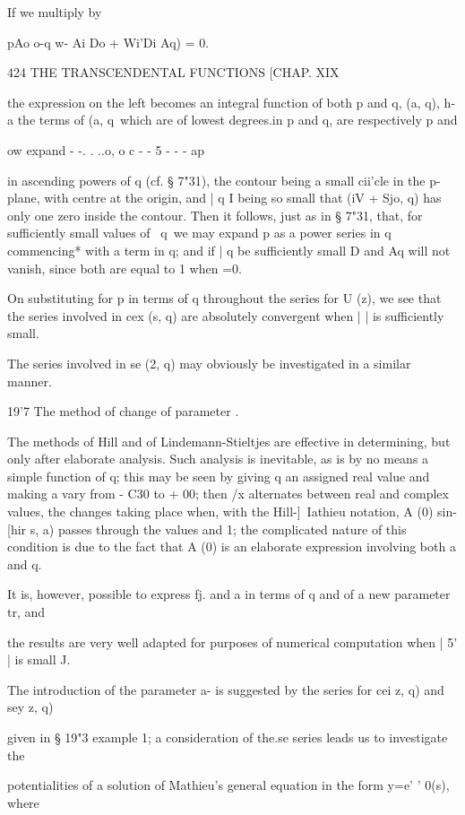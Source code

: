 {{If we multiply by

pAo o-q w- Ai Do + Wi'Di Aq) = 0.

424 THE TRANSCENDENTAL FUNCTIONS [CHAP. XIX

the expression on the left becomes an integral function of both p and
q, (a, q), h-a\; the terms of (a, q\ which are of lowest degrees.in p
and q, are respectively p and

 ow expand - -. . ..o, o c - - 5 - - - ap

in ascending powers of q (cf. § 7"31), the contour being a small
cii'cle in the p-plane, with centre at the origin, and | q I being so
small that (iV + Sjo, q) has only one zero inside the contour. Then it
follows, just as in § 7"31, that, for sufficiently small values of \
q\, we may expand p as a power series in q commencing* with a term in
q; and if | q be sufficiently small D and Aq will not vanish, since
both are equal to 1 when =0.

On substituting for p in terms of q throughout the series for U (z),
we see that the series involved in cex (s, q) are absolutely
convergent when | | is sufficiently small.

The series involved in se (2, q) may obviously be investigated in a
similar manner.

19'7 The method of change of parameter .

The methods of Hill and of Lindemann-Stieltjes are effective in
determining, but only after elaborate analysis. Such analysis is
inevitable, as is by no means a simple function of q; this may be
seen by giving q an assigned real value and making a vary from - C30
to + 00; then /x alternates between real and complex values, the
changes taking place when, with the Hill-]\ Iathieu notation, A (0)
sin- [hir s, a) passes through the values and 1; the complicated
nature of this condition is due to the fact that A (0) is an elaborate
expression involving both a and q.

It is, however, possible to express fj. and a in terms of q and of a
new parameter tr, and

the results are very well adapted for purposes of numerical
computation when | 5' | is small J.

The introduction of the parameter a- is suggested by the series for
cei z, q) and sey z, q)

given in § 19"3 example 1; a consideration of the.se series leads us
to investigate the

potentialities of a solution of Mathieu's general equation in the form
y=e' ' 0(s), where

}}
